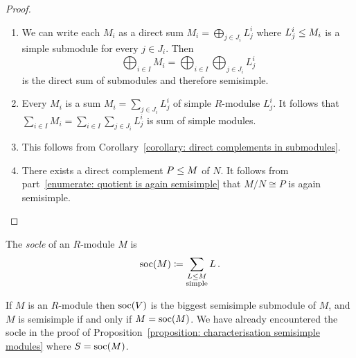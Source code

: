 \begin{proof}
  \leavevmode
  \begin{enumerate}
    \item
      We can write each $M_i$ as a direct sum $M_i = \bigoplus_{j \in J_i} L^i_j$ where $L^i_j \leq M_i$ is a simple submodule for every $j \in J_i$.
      Then
      \[
          \bigoplus_{i \in I} M_i
        = \bigoplus_{i \in I} \bigoplus_{j \in J_i} L^i_j
      \]
      is the direct sum of submodules and therefore semisimple.
    \item
      Every $M_i$ is a sum $M_i = \sum_{j \in J_i} L^i_j$ of simple $R$-modulse $L^i_j$.
      It follows that $\sum_{i \in I} M_i = \sum_{i \in I} \sum_{j \in J_i} L^i_j$ is sum of simple modules.
    \item
      This follows from Corollary~\ref{corollary: direct complements in submodules}.
    \item
      There exists a direct complement $P \leq M$ of $N$.
      It follows from part~\ref*{enumerate: quotient is again semisimple} that $M/N \cong P$ is again semisimple.
    \qedhere
  \end{enumerate}
\end{proof}




\begin{definition}
  The \emph{socle} of an $R$-module $M$ is
  \[
              \operatorname{soc}(M)
    \coloneqq  \sum_{\substack{L \leq M \\ \text{simple}}} L \,.
  \]
\end{definition}


\begin{remark}
  If $M$ is an $R$-module then $\operatorname{soc}(V)$ is the biggest semisimple submodule of $M$, and $M$ is semisimple if and only if $M = \operatorname{soc}(M)$.
  We have already encountered the socle in the proof of Proposition~\ref{proposition: characterisation semisimple modules} where $S = \operatorname{soc}(M)$.
\end{remark}




